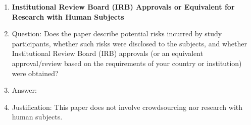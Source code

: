 \begin{enumerate}
\item {\bf Institutional Review Board (IRB) Approvals or Equivalent for Research with Human Subjects}
    \item[] Question: Does the paper describe potential risks incurred by study participants, whether such risks were disclosed to the subjects, and whether Institutional Review Board (IRB) approvals (or an equivalent approval/review based on the requirements of your country or institution) were obtained?
    \item[] Answer: \answerNA{} %
    \item[] Justification: This paper does not involve crowdsourcing nor research with human subjects.

\end{enumerate}